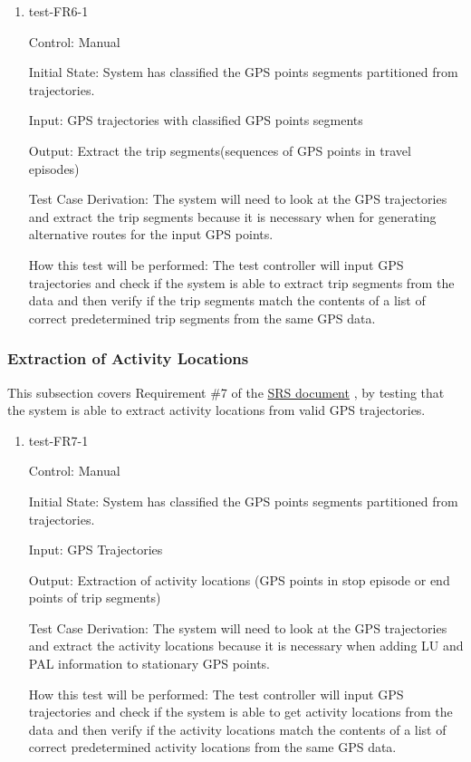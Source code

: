 \documentclass[12pt, titlepage]{article}
\begin{document}
\begin{enumerate}

\item{test-FR6-1\\} \label{test-FR6-1}

Control: Manual 
					
Initial State: System has classified the GPS points segments partitioned from trajectories.
					
Input: GPS trajectories with classified GPS points segments
					
Output: Extract the trip segments(sequences of GPS points in travel episodes)

Test Case Derivation: The system will need to look at the GPS trajectories and extract the trip segments because it is necessary when for generating alternative routes for the input GPS points.
					
How this test will be performed: The test controller will input GPS trajectories and check if the system is able to extract trip segments from the data and then verify if the trip segments match the contents of a list of correct predetermined trip segments from the same GPS data.

\end{enumerate}

\subsubsection{Extraction of Activity Locations}

This subsection covers Requirement \#7 of the \href{https://github.com/paezha/PyERT-BLACK/blob/main/docs/SRS/SRS.pdf}{SRS document} \citep{SRS}, by testing that the system is able to extract activity locations from valid GPS trajectories.

\begin{enumerate}

\item{test-FR7-1\\} \label{test-FR7-1}

Control: Manual 
					
Initial State: System has classified the GPS points segments partitioned from trajectories.
					
Input: GPS Trajectories 
					
Output: Extraction of activity locations (GPS points in stop episode or end points of trip segments)

Test Case Derivation: The system will need to look at the GPS trajectories and extract the activity locations because it is necessary when adding LU and PAL information to stationary GPS points.
					
How this test will be performed: The test controller will input GPS trajectories and check if the system is able to get activity locations from the data and then verify if the activity locations match the contents of a list of correct predetermined activity locations from the same GPS data.

\end{enumerate}
\end{document}
